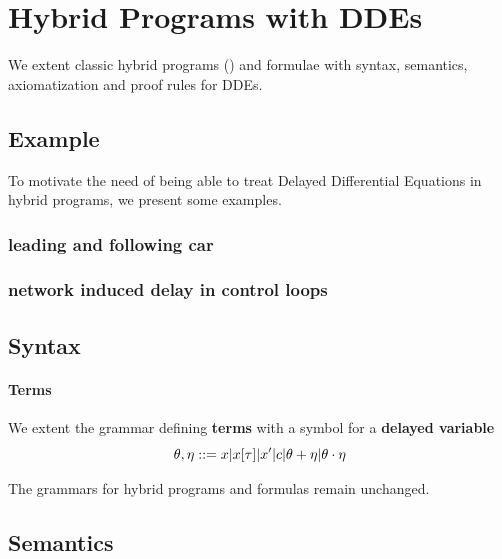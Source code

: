 \documentclass[10pt]{article}
\begin{document}
\section{Hybrid Programs with DDEs}\label{hybrid-programs-with-ddes}

    We extent classic hybrid programs (\HP) and \dL formulae with syntax, semantics, axiomatization and proof rules for DDEs.

    \subsection{Example}
        \label{example-hp-cars}
        To motivate the need of being able to treat Delayed Differential Equations in hybrid programs, we present some examples.

        \subsubsection{leading and following car}

        \subsubsection{network induced delay in control loops}

    \subsection{Syntax}
        \label{sec:syntax}

        \paragraph{Terms}
            \label{sec:terms}

            We extent the grammar defining \textbf{terms} with a symbol for a \textbf{delayed variable}
            \begin{equation}
                \theta,\eta ::= x|x[\tau]|x'|c|\theta+\eta|\theta\cdot\eta
            \end{equation}

    The grammars for hybrid programs and \dL formulas remain unchanged.


    \subsection{Semantics}
        \label{semantics}
\end{document}
